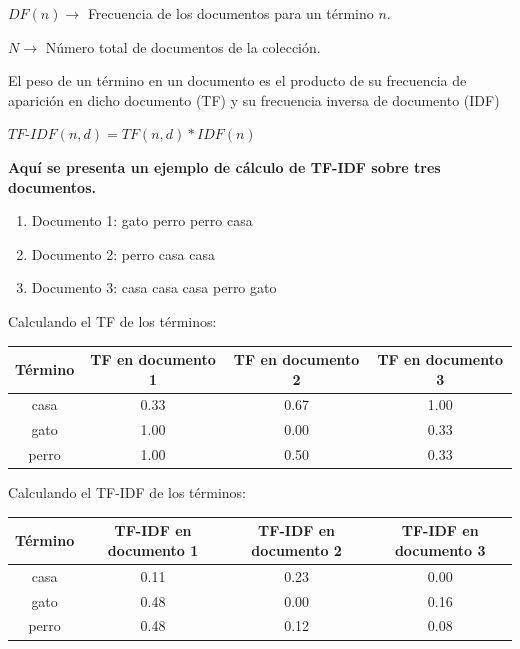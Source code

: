 \documentclass[a4paper,12pt]{article}
\begin{document}
	$DF(n) \rightarrow$ Frecuencia de los documentos para un término $n$.
	
	$N \rightarrow$ Número total de documentos de la colección.
	
	\vspace{0.3cm}
	
	El peso de un término en un documento es el producto de su frecuencia de aparición en dicho documento (TF) y su frecuencia inversa de documento (IDF)
	
	\begin{center}
		$TF$-$IDF(n, d) = TF(n, d) * IDF(n)$
	\end{center}
	
	\textbf {Aquí se presenta un ejemplo de cálculo de TF-IDF sobre tres documentos.}
	
	\begin{enumerate}
		\item{Documento 1: gato perro perro casa}
		\item{Documento 2: perro casa casa}
		\item{Documento 3: casa casa casa perro gato}
	\end{enumerate}
	

	\begin{center}
		Calculando el TF de los términos:
		\vspace{0.50cm}
		\begin{tabular}{c|c|c|c}
			\hline
			Término & TF en documento 1 & TF en documento 2 & TF en documento 3 \\
			\hline
			casa & 0.33 & 0.67 & 1.00 \\
			\hline
			gato & 1.00 & 0.00 & 0.33\\
			\hline
			perro & 1.00 & 0.50 & 0.33\\
		\end{tabular}

		\vspace{0.50cm}

		Calculando el TF-IDF de los términos:	
		\vspace{0.50cm}	
		\begin{tabular}{c|c|c|c}
			\hline
			Término & TF-IDF en documento 1 & TF-IDF en documento 2 & TF-IDF en documento 3 \\
			\hline
			casa & 0.11 & 0.23 & 0.00 \\
			\hline
			gato & 0.48 & 0.00 & 0.16\\
			\hline
			perro & 0.48 & 0.12 & 0.08\\
		\end{tabular}
	\end{center}
	
\end{document}
